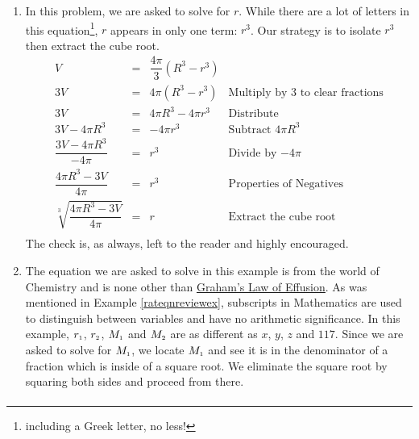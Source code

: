 \documentclass{ximera}
\begin{document}
{{{\begin{example}
\begin{enumerate}
\[\begin{array}{rclr}
\end{array} \]

At this point, the Zero Product Property gives either $n^2 - 2 = 0$ or $n^2 + 1 = 0$.  From $n^2 - 2 = 0$, we get $n^2 = 2$, so $n = \pm \sqrt{2}$.  From $n^2 + 1 = 0$, we get $n^2 = -1$, which gives no real solutions.\footnote{Why is that again?}  Since we raised both sides to an even (the fourth) power, we need to check for extraneous solutions. We find that $n = -\sqrt{2}$ works but $n = \sqrt{2}$ is extraneous.

\item In this problem, we are asked to solve for $r$. While there are a lot of letters in this equation\footnote{including a Greek letter, no less!}, $r$ appears in only one term:  $r^3$.  Our strategy is to isolate $r^3$ then extract the cube root.\[ \begin{array}{rclr}

V & = & \dfrac{4\pi}{3}(R^3 - r^3) & \\ [5pt]

3V & = & 4\pi (R^3 - r^3) &  \text{Multiply by $3$ to clear fractions}\\[2pt]

3V & = & 4\pi R^3 - 4\pi r^3 & \text{Distribute} \\[2pt]

3V - 4\pi R^3 & = & -4 \pi r^3 & \text{Subtract $4 \pi R^3$} \\[2pt]

\dfrac{3V - 4\pi R^3}{-4\pi} & = & r^3 & \text{Divide by $-4\pi$} \\[8pt]

\dfrac{4\pi R^3 - 3V}{4\pi} & = & r^3 & \text{Properties of Negatives} \\[10pt]

\sqrt[3]{\dfrac{4\pi R^3 - 3V}{4\pi}} & = & r & \text{Extract the cube root} \\

\end{array} \] The check is, as always, left to the reader and highly encouraged.

\item  The equation we are asked to solve in this example is from the world of Chemistry and is none other than \href{http://en.wikipedia.org/wiki/Graham's_law}{\underline{Graham's Law of Effusion}}.  As was mentioned in Example \ref{rateqnreviewex}, subscripts in Mathematics are used to distinguish between variables and have no arithmetic significance.  In this example, $r_{\text{\tiny$1$}}$, $r_{\text{\tiny$2$}}$, $M_{\text{\tiny$1$}}$ and $M_{\text{\tiny$2$}}$ are as different as $x$, $y$, $z$ and $117$.  Since we are asked to solve for $M_{\text{\tiny$1$}}$, we locate $M_{\text{\tiny$1$}}$ and see it is in the denominator of a fraction which is inside of a square root.  We eliminate the square root by squaring both sides and proceed from there.  \[ \begin{array}{rclr}


\end{array}\]
\end{enumerate}
\end{example}}}}
\end{document}
